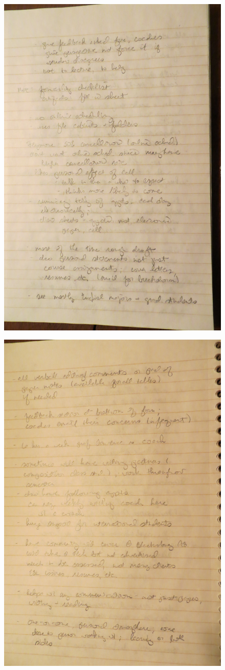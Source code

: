 \documentclass[12pt]{article} %
\begin{document}
  \begin{figure}[H]
  \centering
  \includegraphics[width=0.75\linewidth]{RAZ_raw_notes3}
  \caption{}
  \label{fig:rn3}
  \end{figure}
  \begin{figure}[H]
  \centering
  \includegraphics[width=0.75\linewidth]{RAZ_raw_notes4}
  \caption{}
  \label{fig:rn4}
  \end{figure}
\end{document}
